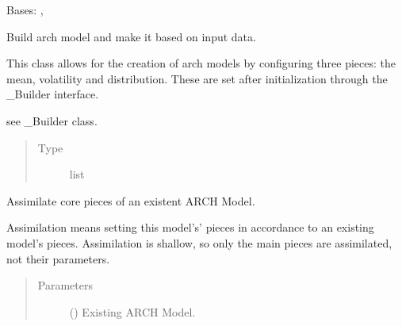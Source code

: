 \documentclass[letterpaper,10pt,english]{sphinxmanual}
\begin{document}
\begin{fulllineitems}
\label{\detokenize{dalio.pipe:dalio.pipe.builders.MakeARCH}}
Bases: {\hyperref[\detokenize{dalio.pipe:dalio.pipe.pipe.Pipe}]{}}, 

Build arch model and make it based on input data.

This class allows for the creation of arch models by configuring three
pieces: the mean, volatility and distribution. These are set after
initialization through the \_Builder interface.

\begin{fulllineitems}
\label{\detokenize{dalio.pipe:dalio.pipe.builders.MakeARCH._piece}}
see \_Builder class.
\begin{quote}\begin{description}
\item[{Type}] \leavevmode
list

\end{description}\end{quote}

\end{fulllineitems}


\begin{fulllineitems}
\label{\detokenize{dalio.pipe:dalio.pipe.builders.MakeARCH.assimilate}}
Assimilate core pieces of an existent ARCH Model.

Assimilation means setting this model’s’ pieces in accordance to an
existing model’s pieces. Assimilation is shallow, so only the main
pieces are assimilated, not their parameters.
\begin{quote}\begin{description}
\item[{Parameters}] \leavevmode
{} () \textendash{} Existing ARCH Model.


\end{description}
\end{quote}
\end{fulllineitems}
\end{fulllineitems}
\end{document}
